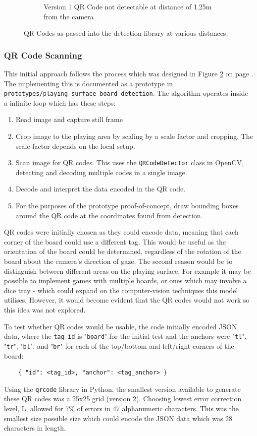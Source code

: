 \documentclass[12pt]{article}
\begin{document}
\begin{figure}[H]
\begin{subfigure}{0.4\textwidth}
        \caption{Version 1 QR Code not detectable at distance of 1.25m from the camera}
        \label{fig:qrcoded}
    \end{subfigure}
    \caption{QR Codes as passed into the detection library at various distances.}
    \label{fig:qrcode}
\end{figure}

\subsubsection{QR Code Scanning}
This initial approach follows the process which was designed in Figure \ref{fig:qrcode} on page \pageref{fig:qrcode}. 
The implementing this is documented as a prototype in \\\texttt{prototypes/playing-surface-board-detection}.
The algorithm operates inside a infinite loop which has these steps: 
\begin{enumerate}
    \item Read image and capture still frame
    \item Crop image to the playing area by scaling by a scale factor and cropping. The scale factor depends on the local setup.
    \item Scan image for QR codes. This uses the \texttt{QRCodeDetector} class in OpenCV, detecting and decoding multiple codes in a single image.
    \item Decode and interpret the data encoded in the QR code.
    \item For the purposes of the prototype proof-of-concept, draw bounding boxes around the QR code at the coordinates found from detection.
\end{enumerate}

QR codes were initially chosen as they could encode data, meaning that each corner of the board could use a different tag. 
This would be useful as the orientation of the board could be determined, regardless of the rotation of the board about the camera's direction of gaze.
The second reason would be to distinguish between different areas on the playing surface. 
For example it may be possible to implement games with multiple boards, or ones which may involve a dice tray - which could expand on the computer-vision techniques this model utilises. 
However, it would become evident that the QR codes would not work so this idea was not explored. 

To test whether QR codes would be usable, the code initially encoded JSON data, where the \texttt{tag\_id} is "\texttt{board}" for the initial test and the anchors were "\texttt{tl}", "\texttt{tr}", "\texttt{bl}", and "\texttt{br}" for each of the top/bottom and left/right corners of the board: 
\begin{verbatim}
    { "id": <tag_id>, "anchor": <tag_anchor> }
\end{verbatim}
Using the \texttt{qrcode} library in Python, the smallest version available to generate these QR codes was a 25x25 grid (version 2). 
Choosing lowest error correction level, L, allowed for 7\% of errors in 47 alphanumeric characters.  
This was the smallest size possible size which could encode the JSON data which was 28 characters in length.
\end{document}
